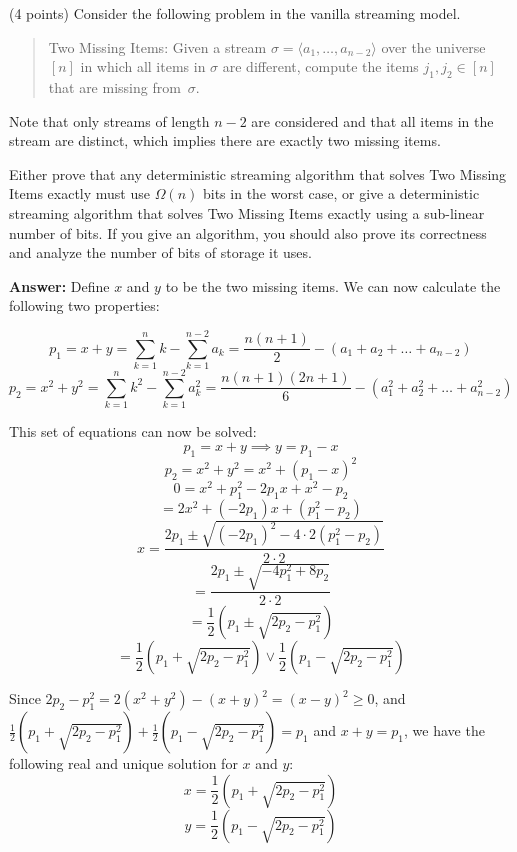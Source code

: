 \documentclass{article}
\newcommand{\twoMissingItems}{{\sc Two Missing Items}\xspace}
\renewcommand{\geq}{\geqslant}
\newcounter{rcounter}
\newenvironment{rlist}%
{\begin{list}{\setnr-\arabic{rcounter}}{\usecounter{rcounter}}}{\end{list}}
\begin{document}
    \begin{rlist}
        
        \item (4 points) Consider the following problem in the vanilla streaming model.
        \begin{quotation}\noindent
            \twoMissingItems: Given a stream $\sigma=\langle a_1,\ldots,a_{n-2}\rangle$ over the universe $[n]$ in which all items in $\sigma$ are different, compute the items $j_1,j_2\in [n]$ that are missing from~$\sigma$.
        \end{quotation}
        Note that only streams of length $n-2$ are considered and that all items in the stream are distinct, which implies there are exactly two missing items.
        
        Either prove that any deterministic streaming algorithm that solves \twoMissingItems exactly must use $\Omega(n)$ bits in the worst case, or give a deterministic streaming algorithm that solves \twoMissingItems exactly using a sub-linear number of bits. If you give an algorithm, you should also prove its correctness and analyze the number of bits of storage it uses.
        
        \textbf{Answer:}
        Define $x$ and $y$ to be the two missing items. We can now calculate the following two properties:
        
        $$p_1 = x + y = \sum_{k=1}^n k - \sum_{k=1}^{n-2} a_k = \frac{n(n+1)}{2} - (a_1 + a_2 + \ldots + a_{n-2})$$
        $$p_2 = x^2 + y^2 = \sum_{k=1}^n k^2 - \sum_{k=1}^{n-2} a_k^2 = \frac{n(n+1)(2n+1)}{6} - (a_1^2 + a_2^2 + \ldots + a_{n-2}^2)$$
        
        This set of equations can now be solved:
        $$p_1 = x + y \implies y = p_1 - x$$
        $$p_2 = x^2 + y^2 = x^2 + (p_1-x)^2$$
        $$0 = x^2 + p_1^2 - 2p_1x + x^2 - p_2$$
        $$= 2x^2 + (-2p_1)x + (p_1^2 - p_2)$$
        $$x = \frac{2p_1 \pm \sqrt{(-2p_1)^2 - 4\cdot2(p_1^2 - p_2)}}{2\cdot2}$$
        $$= \frac{2p_1 \pm \sqrt{-4p_1^2 + 8p_2}}{2\cdot2}$$
        $$= \frac{1}{2}\left(p_1 \pm \sqrt{2p_2 - p_1^2}\right)$$
        $$= \frac{1}{2}\left(p_1 + \sqrt{2p_2 - p_1^2}\right) \vee \frac{1}{2}\left(p_1 - \sqrt{2p_2 - p_1^2}\right)$$
        
        Since $2p_2-p_1^2 = 2(x^2 + y^2) - (x+y)^2 = (x-y)^2 \geq 0$, and $\frac{1}{2}\left(p_1 + \sqrt{2p_2 - p_1^2}\right) + \frac{1}{2}\left(p_1 - \sqrt{2p_2 - p_1^2}\right) = p_1$ and $x+y=p_1$, we have the following real and unique solution for $x$ and $y$:
        $$x = \frac{1}{2}\left(p_1 + \sqrt{2p_2 - p_1^2}\right)$$
        $$y = \frac{1}{2}\left(p_1 - \sqrt{2p_2 - p_1^2}\right)$$
        

\end{rlist}
\end{document}
